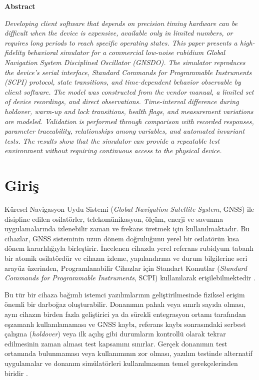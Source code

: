 \documentclass[9pt,twocolumn,a4paper]{extarticle}
\begin{document}
\vspace{9pt}
\begin{center}
  {\fontsize{10}{10.8}\selectfont\bfseries Abstract\par}
\end{center}
\vspace{-6pt}
{\fontsize{9}{10.8}\selectfont\itshape
\noindent Developing client software that depends on precision timing hardware can be difficult when the device is expensive, available only in limited numbers, or requires long periods to reach specific operating states. This paper presents a high-fidelity behavioral simulator for a commercial low-noise rubidium Global Navigation System Disciplined Oscillator (GNSDO). The simulator reproduces the device's serial interface, Standard Commands for Programmable Instruments (SCPI) protocol, state transitions, and time-dependent behavior observable by client software. The model was constructed from the vendor manual, a limited set of device recordings, and direct observations. Time-interval difference during holdover, warm-up and lock transitions, health flags, and measurement variations are modeled. Validation is performed through comparison with recorded responses, parameter traceability, relationships among variables, and automated invariant tests. The results show that the simulator can provide a repeatable test environment without requiring continuous access to the physical device.\par}

\section{Giriş}
Küresel Navigasyon Uydu Sistemi (\emph{Global Navigation Satellite System}, GNSS) ile disipline edilen osilatörler, telekomünikasyon, ölçüm, enerji ve savunma uygulamalarında izlenebilir zaman ve frekans üretmek için kullanılmaktadır. Bu cihazlar, GNSS sisteminin uzun dönem doğruluğunu yerel bir osilatörün kısa dönem kararlılığıyla birleştirir. İncelenen cihazda yerel referans rubidyum tabanlı bir atomik osilatördür ve cihazın izleme, yapılandırma ve durum bilgilerine seri arayüz üzerinden, Programlanabilir Cihazlar için Standart Komutlar (\emph{Standard Commands for Programmable Instruments}, SCPI) kullanılarak erişilebilmektedir \cite{jlt2015,scpi1999}.

Bu tür bir cihaza bağımlı istemci yazılımlarının geliştirilmesinde fiziksel erişim önemli bir darboğaz oluşturabilir. Donanımın pahalı veya sınırlı sayıda olması, aynı cihazın birden fazla geliştirici ya da sürekli entegrasyon ortamı tarafından eşzamanlı kullanılamaması ve GNSS kaybı, referans kaybı sonrasındaki serbest çalışma (\emph{holdover}) veya ilk açılış gibi durumların kontrollü olarak tekrar edilmesinin zaman alması test kapsamını sınırlar. Gerçek donanımın test ortamında bulunmaması veya kullanımının zor olması, yazılım testinde alternatif uygulamalar ve donanım simülatörleri kullanılmasının temel gerekçelerinden biridir \cite{meszaros2007,morita2017}.
\end{document}
